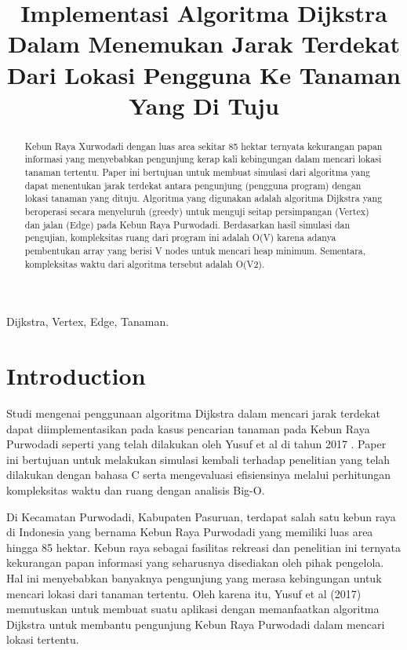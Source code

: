 \documentclass[conference]{IEEEtran}
\title{Implementasi Algoritma Dijkstra Dalam
Menemukan Jarak Terdekat Dari Lokasi Pengguna
Ke Tanaman Yang Di Tuju}
\author{\IEEEauthorblockN{Muhammad Fauzan}
\IEEEauthorblockA{\textit{School of Electrical Engineering and Informatics}\\
\textit{Institut Teknologi Bandung}\\
Bandung, Indonesia\\
Email: 13220009std@stei.itb.ac.id}
}
\begin{document}
\maketitle

\begin{abstract}
    Kebun Raya Xurwodadi dengan luas area sekitar 85
    hektar ternyata kekurangan papan informasi yang menyebabkan
    pengunjung kerap kali kebingungan dalam mencari lokasi tanaman tertentu. Paper ini bertujuan untuk membuat simulasi
    dari algoritma yang dapat menentukan jarak terdekat antara
    pengunjung (pengguna program) dengan lokasi tanaman yang
    dituju. Algoritma yang digunakan adalah algoritma Dijkstra
    yang beroperasi secara menyeluruh (greedy) untuk menguji
    seitap persimpangan (Vertex) dan jalan (Edge) pada Kebun
    Raya Purwodadi. Berdasarkan hasil simulasi dan pengujian,
    kompleksitas ruang dari program ini adalah O(V) karena adanya
    pembentukan array yang berisi V nodes untuk mencari heap minimum. Sementara, kompleksitas waktu dari algoritma tersebut
    adalah O(V2).
\end{abstract}

\begin{IEEEkeywords}
    Dijkstra, Vertex, Edge, Tanaman.
\end{IEEEkeywords}

\section{Introduction}
Studi mengenai penggunaan algoritma Dijkstra dalam mencari jarak terdekat dapat diimplementasikan pada kasus pencarian tanaman pada Kebun Raya Purwodadi seperti yang telah
dilakukan oleh Yusuf et al di tahun 2017 \cite{yusuf2017implementasi}. Paper ini bertujuan untuk melakukan simulasi kembali terhadap penelitian
yang telah dilakukan dengan bahasa C serta mengevaluasi
efisiensinya melalui perhitungan kompleksitas waktu dan ruang dengan analisis Big-O.

Di Kecamatan Purwodadi, Kabupaten Pasuruan, terdapat
salah satu kebun raya di Indonesia yang bernama Kebun
Raya Purwodadi yang memiliki luas area hingga 85 hektar.
Kebun raya sebagai fasilitas rekreasi dan penelitian ini ternyata
kekurangan papan informasi yang seharusnya disediakan oleh
pihak pengelola. Hal ini menyebabkan banyaknya pengunjung
yang merasa kebingungan untuk mencari lokasi dari tanaman
tertentu. Oleh karena itu, Yusuf et al (2017) memutuskan
untuk membuat suatu aplikasi dengan memanfaatkan algoritma
Dijkstra untuk membantu pengunjung Kebun Raya Purwodadi
dalam mencari lokasi tertentu.
\end{document}
